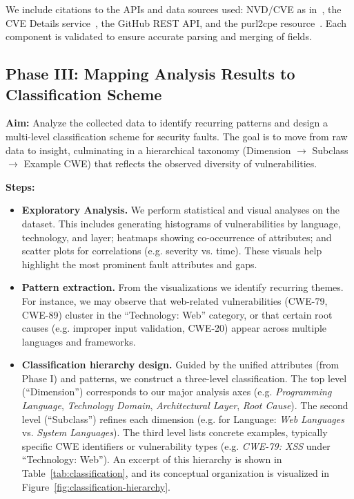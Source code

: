 We include citations to the APIs and data sources used: NVD/CVE as in~\cite{nvd_nist}, the CVE Details service~\cite{cve_details}, the GitHub REST API, and the purl2cpe resource~. Each component is validated to ensure accurate parsing and merging of fields. \subsection{Phase III: Mapping Analysis Results to Classification Scheme} \textbf{Aim:} Analyze the collected data to identify recurring patterns and design a multi-level classification scheme for security faults. The goal is to move from raw data to insight, culminating in a hierarchical taxonomy (Dimension $\rightarrow$ Subclass $\rightarrow$ Example CWE) that reflects the observed diversity of vulnerabilities. 
\newline

\textbf{Steps:}
\begin{itemize}
    \item \textbf{Exploratory Analysis.} We perform statistical and visual analyses on the dataset. This includes generating histograms of vulnerabilities by language, technology, and layer; heatmaps showing co-occurrence of attributes; and scatter plots for correlations (e.g. severity vs. time). These visuals help highlight the most prominent fault attributes and gaps.
    \item \textbf{Pattern extraction.} From the visualizations we identify recurring themes. For instance, we may observe that web-related vulnerabilities (CWE-79, CWE-89) cluster in the “Technology: Web” category, or that certain root causes (e.g. improper input validation, CWE-20) appear across multiple languages and frameworks.
    \item \textbf{Classification hierarchy design.} Guided by the unified attributes (from Phase I) and patterns, we construct a three-level classification. The top level (“Dimension”) corresponds to our major analysis axes (e.g. {\em Programming Language}, {\em Technology Domain}, {\em Architectural Layer}, {\em Root Cause}). The second level (“Subclass”) refines each dimension (e.g. for Language: {\em Web Languages} vs. {\em System Languages}). The third level lists concrete examples, typically specific CWE identifiers or vulnerability types (e.g. {\em CWE-79: XSS} under “Technology: Web”). An excerpt of this hierarchy is shown in Table~\ref{tab:classification}, and its conceptual organization is visualized in Figure~\ref{fig:classification-hierarchy}.
\end{itemize}

